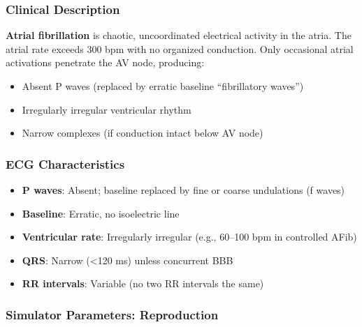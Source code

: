 \documentclass[12pt,a4paper,oneside]{book}
\begin{document}
\subsubsection{Clinical Description}

\textbf{Atrial fibrillation} is chaotic, uncoordinated electrical activity in the atria. The atrial rate exceeds 300 bpm with no organized conduction. Only occasional atrial activations penetrate the AV node, producing:

\begin{itemize}
    \item Absent P waves (replaced by erratic baseline ``fibrillatory waves'')
    \item Irregularly irregular ventricular rhythm
    \item Narrow \QRS complexes (if conduction intact below AV node)
\end{itemize}

\subsubsection{ECG Characteristics}

\begin{itemize}
    \item \textbf{P waves}: Absent; baseline replaced by fine or coarse undulations (f waves)
    \item \textbf{Baseline}: Erratic, no isoelectric line
    \item \textbf{Ventricular rate}: Irregularly irregular (e.g., 60–100 bpm in controlled AFib)
    \item \textbf{QRS}: Narrow (<120 ms) unless concurrent BBB
    \item \textbf{RR intervals}: Variable (no two RR intervals the same)
\end{itemize}

\subsubsection{Simulator Parameters: Reproduction}
\end{document}
